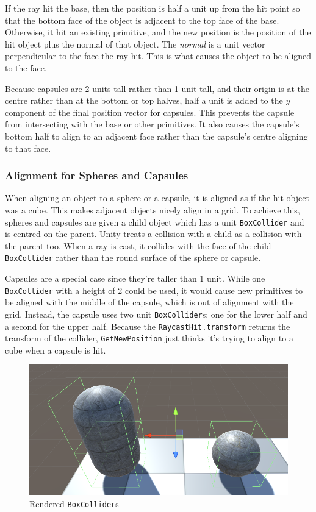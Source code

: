 \documentclass[a4paper, 12pt]{scrartcl}
\begin{document}
If the ray hit the base, then the position is half a unit up from the hit point so that the bottom face of the object is adjacent to the top face of the base. Otherwise, it hit an existing primitive, and the new position is the position of the hit object plus the normal of that object. The \textit{normal} is a unit vector perpendicular to the face the ray hit. This is what causes the object to be aligned to the face.

Because capsules are 2 units tall rather than 1 unit tall, and their origin is at the centre rather than at the bottom or top halves, half a unit is added to the $y$ component of the final position vector for capsules. This prevents the capsule from intersecting with the base or other primitives. It also causes the capsule's bottom half to align to an adjacent face rather than the capsule's centre aligning to that face.

\subsubsection{Alignment for Spheres and Capsules}
When aligning an object to a sphere or a capsule, it is aligned as if the hit object was a cube. This makes adjacent objects nicely align in a grid. To achieve this, spheres and capsules are given a child object which has a unit \texttt{BoxCollider} and is centred on the parent. Unity treats a collision with a child as a collision with the parent too. When a ray is cast, it collides with the face of the child \texttt{BoxCollider} rather than the round surface of the sphere or capsule.

Capsules are a special case since they're taller than 1 unit. While one \texttt{BoxCollider} with a height of 2 could be used, it would cause new primitives to be aligned with the middle of the capsule, which is out of alignment with the grid. Instead, the capsule uses two unit \texttt{BoxCollider}s: one for the lower half and a second for the upper half. Because the \texttt{RaycastHit.transform} returns the transform of the collider, \texttt{GetNewPosition} just thinks it's trying to align to a cube when a capsule is hit.

\begin{figure}[htp]
  \centering
  \includegraphics[width=\linewidth]{images/02_box_colliders.png}
  \caption{Rendered \texttt{BoxCollider}s}
\end{figure}
\end{document}
